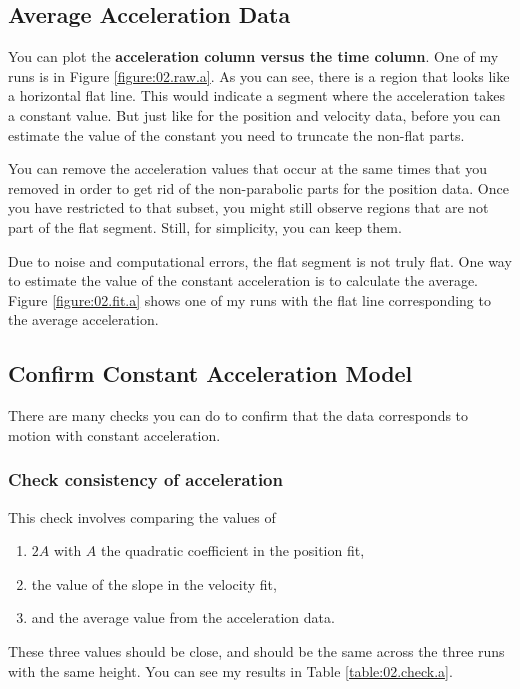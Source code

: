 \subsection{Average Acceleration Data}
You can plot the \textbf{acceleration column versus the time column}. One of my runs is in Figure \ref{figure:02.raw.a}. As you can see, there is a region that looks like a horizontal flat line. This would indicate a segment where the acceleration takes a constant value. But just like for the position and velocity data, before you can estimate the value of the constant you need to truncate the non-flat parts.

You can remove the acceleration values that occur at the same times that you removed in order to get rid of the non-parabolic parts for the position data. Once you have restricted to that subset, you might still observe regions that are not part of the flat segment. Still, for simplicity, you can keep them.

Due to noise and computational errors, the flat segment is not truly flat. One way to estimate the value of the constant acceleration is to calculate the average. Figure \ref{figure:02.fit.a} shows one of my runs with the flat line corresponding to the average acceleration. 
\subsection{Confirm Constant Acceleration Model}
There are many checks you can do to confirm that the data corresponds to motion with constant acceleration.
\subsubsection{Check consistency of acceleration}
This check involves comparing the values of
\begin{enumerate}
    \item $2A$ with $A$ the quadratic coefficient in the position fit,
    \item the value of the slope in the velocity fit,
    \item and the average value from the acceleration data.
\end{enumerate}
These three values should be close, and should be the same across the three runs with the same height. You can see my results in Table \ref{table:02.check.a}.
